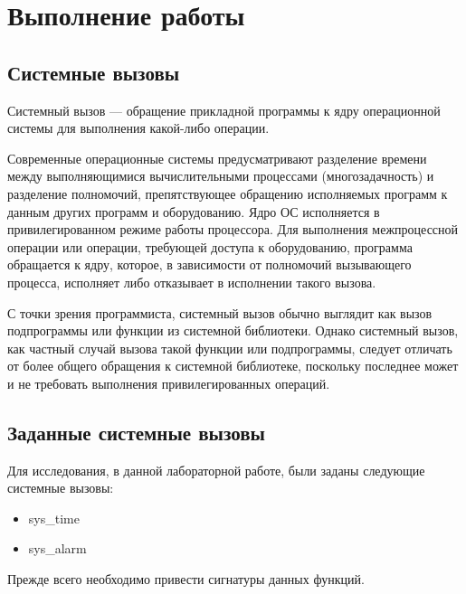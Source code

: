 \clearpage

\section{Выполнение работы}

\subsection{Системные вызовы} %

\par Системный вызов — обращение прикладной программы к ядру операционной системы для выполнения какой-либо операции.

\par Современные операционные системы предусматривают разделение времени между выполняющимися вычислительными процессами (многозадачность) и разделение полномочий, препятствующее обращению исполняемых программ к данным других программ и оборудованию. Ядро ОС исполняется в привилегированном режиме работы процессора. Для выполнения межпроцессной операции или операции, требующей доступа к оборудованию, программа обращается к ядру, которое, в зависимости от полномочий вызывающего процесса, исполняет либо отказывает в исполнении такого вызова.

\par С точки зрения программиста, системный вызов обычно выглядит как вызов подпрограммы или функции из системной библиотеки. Однако системный вызов, как частный случай вызова такой функции или подпрограммы, следует отличать от более общего обращения к системной библиотеке, поскольку последнее может и не требовать выполнения привилегированных операций.

\subsection{Заданные системные вызовы} %

\par Для исследования, в данной лабораторной работе, были заданы следующие системные вызовы:

\begin{itemize}
    \item sys\_time 
    \item sys\_alarm
\end{itemize}


\par Прежде всего необходимо привести сигнатуры данных функций.

